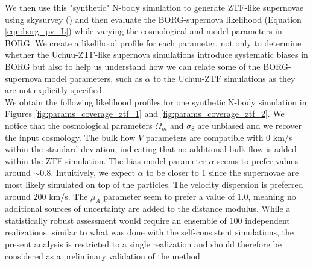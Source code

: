 We then use this "synthetic" N-body simulation to generate ZTF-like supernovae using skysurvey (\cite{Rigault_2026}) and then evaluate the BORG-supernova likelihood (Equation \ref{eqn:borg_pv_L}) 
while varying the cosmological and model parameters in BORG. We create a likelihood profile for each parameter, not only to 
determine whether the Uchuu-ZTF-like supernova simulations introduce systematic biases in BORG but also to help us understand how we can relate some of the BORG-supernova model 
parameters, 
such as $\alpha$ to the Uchuu-ZTF simulations as they are not explicitly specified. \\

We obtain the following likelihood profiles for one synthetic N-body simulation in Figures \ref{fig:params_coverage_ztf_1} and \ref{fig:params_coverage_ztf_2}. 
We notice that the cosmological parameters $\Omega_m$ and $\sigma_8$ are unbiased and we recover the 
input cosmology. The bulk flow $V$ parameters are compatible with 0 km/s within the standard deviation, 
indicating that no additional bulk flow is added within the ZTF simulation. 
The bias model parameter $\alpha$ 
seems to prefer values around $\sim 0.8$. Intuitively, we expect $\alpha$ to be closer to 1 since the supernovae are most likely simulated on top of the particles.  
The velocity dispersion is preferred around $200$ km/s. 
The $\mu_A$ parameter seem to prefer a value of $1.0$, meaning no additional sources of uncertainty are added to the distance modulus. 
While a statistically robust assessment would require an ensemble of 100 independent realizations, similar to what was done with the self-consistent simulations, 
the present analysis is restricted to a single realization and should therefore be considered as a preliminary validation of the method.

